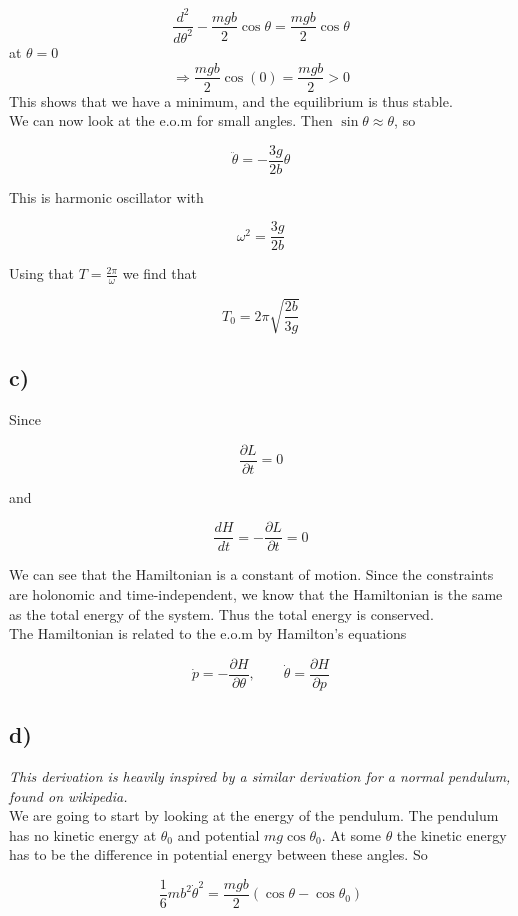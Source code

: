 \documentclass[a4paper,norsk, 10pt]{article}
\begin{document}
$$
\frac{d^2}{d\theta^2} -\frac{mgb}{2}\cos\theta = \frac{mgb}{2}\cos\theta
$$
at $\theta = 0$
$$
\Rightarrow \frac{mgb}{2}\cos(0) = \frac{mgb}{2} > 0
$$
This shows that we have a minimum, and the equilibrium is thus stable.\\

We can now look at the e.o.m for small angles. Then $\sin \theta \approx \theta$, so

$$
\ddot{\theta} = - \frac{3g}{2b}\theta
$$

This is harmonic oscillator with 

$$
\omega^2 = \frac{3g}{2b}
$$

Using that $T = \frac{2\pi}{\omega}$ we find that

$$
T_0 = 2\pi \sqrt{\frac{2b}{3g}}
$$

\subsection*{c)}

Since 

$$
\frac{\partial L}{\partial t} = 0
$$

and 

$$
\frac{dH}{dt} = -\frac{\partial L}{\partial t} = 0
$$

We can see that the Hamiltonian is a constant of motion. Since the constraints are holonomic and time-independent, we know that the Hamiltonian is the same as the total energy of the system. Thus the total energy is conserved.\\

The Hamiltonian is related to the e.o.m by Hamilton's equations

$$
\dot{p} = -\frac{\partial H}{\partial \theta},\qquad \dot{\theta} = \frac{\partial H}{\partial p}
$$

\subsection*{d)}
\textit{This derivation is heavily inspired by a similar derivation for a normal pendulum, found on wikipedia.}\\

We are going to start by looking at the energy of the pendulum. The pendulum has no kinetic energy at $\theta_0$ and potential $mg\cos\theta_0$. At some $\theta$ the kinetic energy has to be the difference in potential energy between these angles. So

$$
\frac{1}{6}mb^2\dot{\theta}^2 = \frac{mgb}{2}(\cos\theta - \cos\theta_0)
$$
\end{document}
